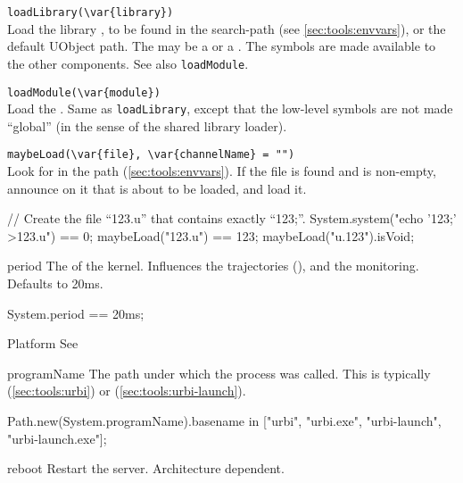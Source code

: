 \begin{urbiscriptapi}
\item \lstinline|loadLibrary(\var{library})|\\
  Load the library , to be found in the
   search-path (see
  \autoref{sec:tools:envvars}), or the default UObject path.
  The  may be a  or a .
  The \Cxx symbols are made available to the other \Cxx components.  See also
  \lstinline|loadModule|.

\item \lstinline|loadModule(\var{module})|\\
  Load the \UObject {}.  Same as \lstinline|loadLibrary|,
  except that the low-level \Cxx symbols are not made ``global'' (in
  the sense of the shared library loader).

\item \lstinline|maybeLoad(\var{file}, \var{channelName} = "")|\\
  Look for  in the \urbi path
  (\autoref{sec:tools:envvars}).  If the file is found and
   is non-empty, announce on it that  is
  about to be loaded, and load it.

\begin{urbiassert}
// Create the file ``123.u'' that contains exactly ``123;''.
System.system("echo '123;' >123.u") == 0;
maybeLoad("123.u") == 123;
maybeLoad("u.123").isVoid;
\end{urbiassert}

\item[period] The  of the \urbi kernel.  Influences the
  trajectories (), and the \UObject
  monitoring.  Defaults to 20ms.
\begin{urbiassert}
System.period == 20ms;
\end{urbiassert}

\item[Platform] See 

\item[programName] The path under which the \urbi process was called.
  This is typically  (\autoref{sec:tools:urbi}) or
   (\autoref{sec:tools:urbi-launch}).
\begin{urbiassert}
Path.new(System.programName).basename
  in ["urbi", "urbi.exe", "urbi-launch", "urbi-launch.exe"];
\end{urbiassert}

\item[reboot] Restart the \urbi server.  Architecture dependent.


\end{urbiscriptapi}
